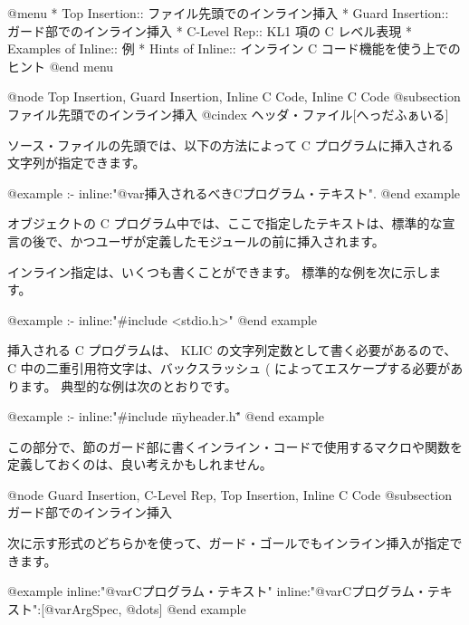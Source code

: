 @menu
* Top Insertion::               ファイル先頭でのインライン挿入
* Guard Insertion::             ガード部でのインライン挿入
* C-Level Rep::                 KL1 項の C レベル表現
* Examples of Inline::          例
* Hints of Inline::             インライン C コード機能を使う上でのヒント
@end menu

@node Top Insertion, Guard Insertion, Inline C Code, Inline C Code
@subsection ファイル先頭でのインライン挿入
@cindex ヘッダ・ファイル[へっだふぁいる]

ソース・ファイルの先頭では、以下の方法によって C プログラムに挿入される文字列が指定できます。

@example
:- inline:"@var{挿入されるべきCプログラム・テキスト}".
@end example

オブジェクトの C プログラム中では、ここで指定したテキストは、標準的な宣言の後で、かつユーザが定義したモジュールの前に挿入されます。

インライン指定は、いくつも書くことができます。
標準的な例を次に示します。

@example
:- inline:"#include <stdio.h>"
@end example

挿入される C プログラムは、 KLIC の文字列定数として書く必要があるので、
C 中の二重引用符文字は、バックスラッシュ (\) によってエスケープする必要があります。
典型的な例は次のとおりです。

@example
:- inline:"#include \"myheader.h\""
@end example

この部分で、節のガード部に書くインライン・コードで使用するマクロや関数を定義しておくのは、良い考えかもしれません。

@node Guard Insertion, C-Level Rep, Top Insertion, Inline C Code
@subsection ガード部でのインライン挿入

次に示す形式のどちらかを使って、ガード・ゴールでもインライン挿入が指定できます。

@example
inline:"@var{Cプログラム・テキスト}"
inline:"@var{Cプログラム・テキスト}":[@var{ArgSpec}, @dots{}]
@end example


